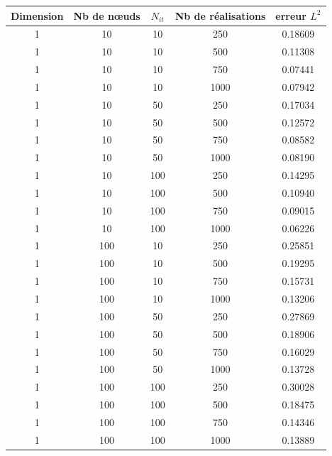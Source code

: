 \begin{table}[htbp]
  \centering
\begin{tabular}{|c |c |c |c |c |}
\hline
Dimension & Nb de n\oe uds & $N_{it}$ & Nb de réalisations & erreur $L^2$ \\
\hline
1 & 10 & 10 & 250 & 0.18609  \\
\hline
1 & 10 & 10 & 500 & 0.11308   \\
\hline
1 & 10 & 10 & 750 & 0.07441  \\
\hline
1 & 10 & 10 & 1000 & 0.07942 \\
\hline
\hline
1 & 10 & 50 & 250 & 0.17034 \\
\hline
1 & 10 & 50 & 500 & 0.12572  \\
\hline
1 & 10 & 50 & 750 & 0.08582  \\
\hline
1 & 10 & 50 & 1000 & 0.08190 \\
\hline
\hline
1 & 10 & 100 & 250  & 0.14295 \\
\hline
1 & 10 & 100 & 500  & 0.10940 \\
\hline
1 & 10 & 100 & 750  & 0.09015  \\
\hline
1 & 10 & 100 & 1000 & 0.06226  \\
\hline
\hline
1 & 100 & 10 & 250 & 0.25851  \\
\hline
1 & 100 & 10 & 500 & 0.19295   \\
\hline
1 & 100 & 10 & 750 & 0.15731  \\
\hline
1 & 100 & 10 & 1000 & 0.13206 \\
\hline
\hline
1 & 100 & 50 & 250 & 0.27869 \\
\hline
1 & 100 & 50 & 500 & 0.18906  \\
\hline
1 & 100 & 50 & 750 &  0.16029 \\
\hline
1 & 100 & 50 & 1000 & 0.13728 \\
\hline
\hline
1 & 100 & 100 & 250  & 0.30028 \\
\hline
1 & 100 & 100 & 500  & 0.18475 \\
\hline
1 & 100 & 100 & 750  & 0.14346  \\
\hline
1 & 100 & 100 & 1000 & 0.13889  \\
\hline
\end{tabular}
\end{table}
